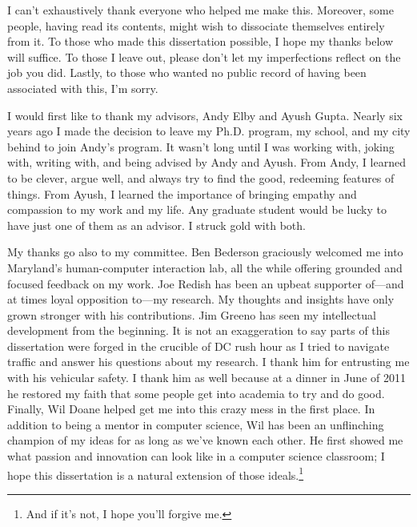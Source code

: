 I can't exhaustively thank everyone who helped me make this. Moreover,
some people, having read its contents, might wish to dissociate
themselves entirely from it. To those who made this dissertation
possible, I hope my thanks below will suffice. To those I leave out,
please don't let my imperfections reflect on the job you did. Lastly, to
those who wanted no public record of having been associated with this,
I'm sorry.

I would first like to thank my advisors, Andy Elby and Ayush Gupta.
Nearly six years ago I made the decision to leave my Ph.D. program, my
school, and my city behind to join Andy's program. It wasn't long until
I was working with, joking with, writing with, and being advised by Andy
and Ayush. From Andy, I learned to be clever, argue well, and always try
to find the good, redeeming features of things. From Ayush, I learned
the importance of bringing empathy and compassion to my work and my
life. Any graduate student would be lucky to have just one of them as an
advisor. I struck gold with both.

My thanks go also to my committee. Ben Bederson graciously welcomed me
into Maryland's human-computer interaction lab, all the while offering
grounded and focused feedback on my work. Joe Redish has been an upbeat
supporter of---and at times loyal opposition to---my research. My
thoughts and insights have only grown stronger with his contributions.
Jim Greeno has seen my intellectual development from the beginning. It
is not an exaggeration to say parts of this dissertation were forged in
the crucible of DC rush hour as I tried to navigate traffic and answer
his questions about my research. I thank him for entrusting me with his
vehicular safety. I thank him as well because at a dinner in June of
2011 he restored my faith that some people get into academia to try and
do good. Finally, Wil Doane helped get me into this crazy mess in the
first place. In addition to being a mentor in computer science, Wil has
been an unflinching champion of my ideas for as long as we've known each
other. He first showed me what passion and innovation can look like in a
computer science classroom; I hope this dissertation is a natural
extension of those ideals.\footnote{And if it's not, I hope you'll
  forgive me.}


